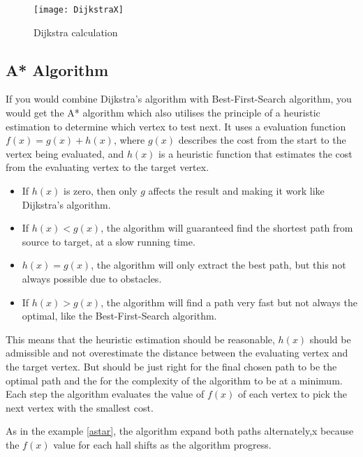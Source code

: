   \begin{figure}[ht!]
    \centering
    \texttt{[image: DijkstraX]}
    \caption{Dijkstra calculation}
    \label{fig:dijkstra_calc}
  \end{figure}

  \subsection{A* Algorithm}

  If you would combine Dijkstra's algorithm with Best-First-Search algorithm, you would get the A* algorithm which also utilises the principle of a heuristic estimation to determine which vertex to test next. It uses a evaluation function $f(x) = g(x) + h(x)$, where $g(x)$ describes the cost from the start to the vertex being evaluated, and $h(x)$ is a heuristic function that estimates the cost from the evaluating vertex to the target vertex. \cite{Patel2013}

  \begin{itemize}
    \item If $h(x)$ is zero, then only $g$ affects the result and making it work like Dijkstra's algorithm.

    \item If $h(x) < g(x)$, the algorithm will guaranteed find the shortest path from source to target, at a slow running time.

    \item $h(x) = g(x)$, the algorithm will only extract the best path, but this not always possible due to obstacles.

    \item If $h(x) > g(x)$, the algorithm will find a path very fast but not always the optimal, like the Best-First-Search algorithm.
  \end{itemize}

  This means that the heuristic estimation should be reasonable, $h(x)$ should be admissible and not overestimate the distance between the evaluating vertex and the target vertex. But should be just right for the final chosen path to be the optimal path and the for the complexity of the algorithm to be at a minimum. Each step the algorithm evaluates the value of $f(x)$ of each vertex to pick the next vertex with the smallest cost.

  As in the example \cref{astar}, the algorithm expand both paths alternately,x because the $f(x)$ value for each hall shifts as the algorithm progress. 

